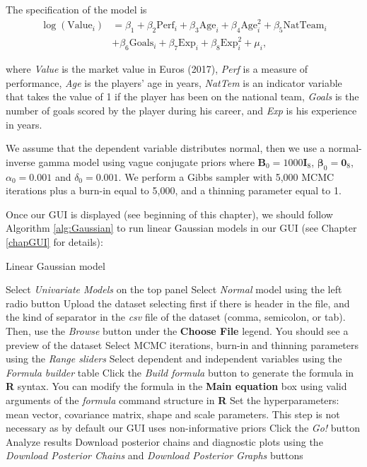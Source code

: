 The specification of the model is
\begin{align*}
	\log(\text{Value}_i)&={\beta}_1+{\beta}_2\text{Perf}_i+{\beta}_3\text{Age}_i+{\beta}_4\text{Age}^2_i+{\beta}_5\text{NatTeam}_i\\
	&+{\beta}_6\text{Goals}_i+{\beta}_7\text{Exp}_i+{\beta}_{8}\text{Exp}^2_i+\mu_i,
\end{align*}

where \textit{Value} is the market value in Euros (2017), \textit{Perf} is a measure of performance, \textit{Age} is the players' age in years, \textit{NatTem} is an indicator variable that takes the value of 1 if the player has been on the national team, \textit{Goals} is the number of goals scored by the player during his career, and \textit{Exp} is his experience in years.  

We assume that the dependent variable distributes normal, then we use a normal-inverse gamma model using vague conjugate priors where ${\bm{B}}_0=1000{\bm{I}}_{8}$, $\bm{\beta}_0={\bm{0}}_{8}$, $\alpha_0=0.001$ and $\delta_0=0.001$. We perform a Gibbs sampler with 5,000 MCMC iterations plus a burn-in equal to 5,000, and a thinning parameter equal to 1.

Once our GUI is displayed (see beginning of this chapter), we should follow Algorithm \ref{alg:Gaussian} to run linear Gaussian models in our GUI (see Chapter \ref{chapGUI} for details):
\begin{algorithm}[h!]
	\caption{Linear Gaussian model}\label{alg:Gaussian}
	\begin{algorithmic}[1]  		 			
		\State Select \textit{Univariate Models} on the top panel
		\State Select \textit{Normal} model using the left radio button
		\State Upload the dataset selecting first if there is header in the file, and the kind of separator in the \textit{csv} file of the dataset (comma, semicolon, or tab). Then, use the \textit{Browse} button under the \textbf{Choose File} legend. You should see a preview of the dataset
		\State Select MCMC iterations, burn-in and thinning parameters using the \textit{Range sliders}
		\State Select dependent and independent variables using the \textit{Formula builder} table
		\State Click the \textit{Build formula} button to generate the formula in \textbf{R} syntax. You can modify the formula in the \textbf{Main equation} box using valid arguments of the \textit{formula} command structure in \textbf{R}
		\State Set the hyperparameters: mean vector, covariance matrix, shape and scale parameters. This step is not necessary as by default our GUI uses non-informative priors
		\State Click the \textit{Go!} button
		\State Analyze results
		\State Download posterior chains and diagnostic plots using the \textit{Download Posterior Chains} and \textit{Download Posterior Graphs} buttons
	\end{algorithmic} 
\end{algorithm}

